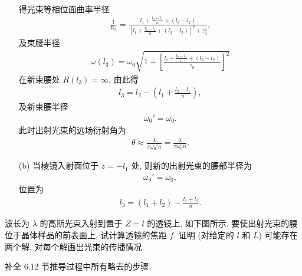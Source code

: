 \documentclass{note}
\begin{document}
\begin{sol}
\begin{itemize}
\begin{align}
        \end{align}
        得光束等相位面曲率半径
        \begin{align}
            \frac{1}{R_3}=\frac{l_1+\frac{l_2-l_1}{n}+(l_3-l_2)}{\left[l_1+\frac{l_2-l_1}{n}+(l_3-l_2)\right]^2+z_0^2},
        \end{align}
        及束腰半径
        \begin{align}
            \omega(l_3)=\omega_0\sqrt{1+\left[\frac{l_1+\frac{l_2-l_1}{n}+(l_3-l_2)}{z_0}\right]^2}
        \end{align}
        在新束腰处 $R(l_3)=\infty$, 由此得
        \begin{align}
            l_3=l_2-\left(l_1+\frac{l_2-l_1}{n}\right),
        \end{align}
        及新束腰半径
        \begin{align}
            \omega_0'=\omega_0.
        \end{align}
        此时出射光束的远场衍射角为
        \begin{align}
            \theta\approx\frac{\lambda}{\pi\omega_0'n}=\frac{\lambda}{\pi\omega_0n}.
        \end{align}
        \item[(b)] 当棱镜入射面位于 $z=-l_1$ 处, 则新的出射光束的腰部半径为
        \begin{align}
            \omega_0'=\omega_0,
        \end{align}
        位置为
        \begin{align}
            l_3=(l_1+l_2)-\frac{l_1+l_2}{n}.
        \end{align}
    \end{itemize}
\end{sol}

\begin{exe}
    波长为 $\lambda$ 的高斯光束入射到置于 $Z=l$ 的透镜上, 如下图所示.
    要使出射光束的腰位于晶体样品的前表面上, 试计算透镜的焦距 $f$. 证明 (对给定的 $l$ 和 $L$) 可能存在两个解. 对每个解画出光束的传播情况.
\end{exe}
\begin{pf}
    
\end{pf}

\begin{exe}
    补全 6.12 节推导过程中所有略去的步骤.
\end{exe}
\begin{pf}
    
\end{pf}

\begin{exe}

\end{exe}
\ifx\allfiles\undefined
\end{document}
